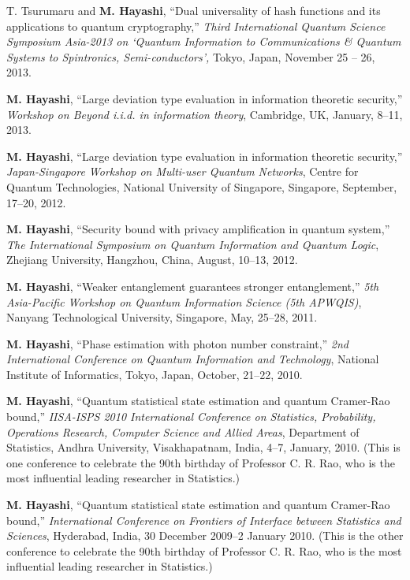 \documentclass[a4paper,12pt,oneside]{article}
\begin{document}
\begin{enumerate}
T. Tsurumaru and \textbf{M. Hayashi}, 
``Dual universality of hash functions and its applications to quantum
cryptography,''
{\em Third International Quantum Science Symposium Asia-2013
on `Quantum Information to Communications \& Quantum Systems to Spintronics, Semi-conductors',}
Tokyo, Japan, November 25 -- 26, 2013.

\textbf{M. Hayashi}, 
``Large deviation type evaluation in information theoretic security,''
{\em Workshop on Beyond i.i.d. in information theory},
Cambridge, UK, January, 8--11, 2013.

\textbf{M. Hayashi}, 
``Large deviation type evaluation in information theoretic security,'' 
{\em Japan-Singapore Workshop on Multi-user Quantum Networks}, 
Centre for Quantum Technologies, National University of Singapore, Singapore, September, 17--20, 2012.


\textbf{M. Hayashi}, 
``Security bound with privacy amplification in quantum system,'' 
{\em The International Symposium on Quantum Information and Quantum Logic}, 
Zhejiang University, Hangzhou, China, August, 10--13, 2012.


\textbf{M. Hayashi}, 
``Weaker entanglement guarantees stronger entanglement,'' 
{\em 5th Asia-Pacific Workshop on Quantum Information Science (5th APWQIS)}, 
Nanyang Technological University, Singapore, May, 25--28, 2011.

\textbf{M. Hayashi}, 
``Phase estimation with photon number constraint,'' 
{\em 2nd International Conference on Quantum Information and Technology}, 
National Institute of Informatics, Tokyo, Japan, October, 21--22, 2010.

\textbf{M. Hayashi}, 
``Quantum statistical state estimation and quantum Cramer-Rao bound,'' 
{\em IISA-ISPS 2010 International Conference on Statistics, Probability, Operations Research, Computer Science and Allied Areas}, 
Department of Statistics, Andhra University, Visakhapatnam, India, 4--7, January, 2010.
(This is one conference to celebrate the 90th birthday of Professor C. R. Rao,
who is the most influential leading researcher in Statistics.)

\textbf{M. Hayashi}, 
``Quantum statistical state estimation and quantum Cramer-Rao bound,'' 
{\em International Conference on Frontiers of Interface between Statistics and Sciences}, 
Hyderabad, India, 30 December 2009--2 January 2010.
(This is the other conference to celebrate the 90th birthday of Professor C. R. Rao,
who is the most influential leading researcher in Statistics.)



\end{enumerate}
\end{document}
